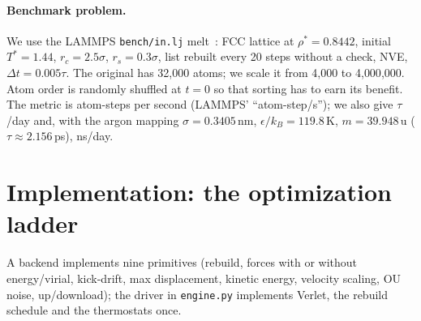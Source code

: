 \documentclass[11pt]{article}
\begin{document}
\paragraph{Benchmark problem.} We use the LAMMPS \texttt{bench/in.lj} melt~\cite{lammps_inlj}:
FCC lattice at $\rho^*=0.8442$, initial $T^*=1.44$, $r_c=2.5\sigma$, $r_s=0.3\sigma$, list rebuilt
every 20 steps without a check, NVE, $\Delta t=0.005\tau$. The original has 32{,}000 atoms;
we scale it from 4{,}000 to 4{,}000{,}000. Atom order is randomly shuffled at $t=0$ so that
sorting has to earn its benefit. The metric is atom-steps per second (LAMMPS'
``atom-step/s''); we also give $\tau$/day and, with the argon mapping
$\sigma=0.3405$\,nm, $\epsilon/k_B=119.8$\,K, $m=39.948$\,u ($\tau\approx2.156$\,ps), ns/day.

\section{Implementation: the optimization ladder}\label{sec:impl}
A backend implements nine primitives (rebuild, forces with or without energy/virial,
kick-drift, max displacement, kinetic energy, velocity scaling, OU noise, up/download); the
driver in \texttt{engine.py} implements Verlet, the rebuild schedule and the thermostats once.
\end{document}
